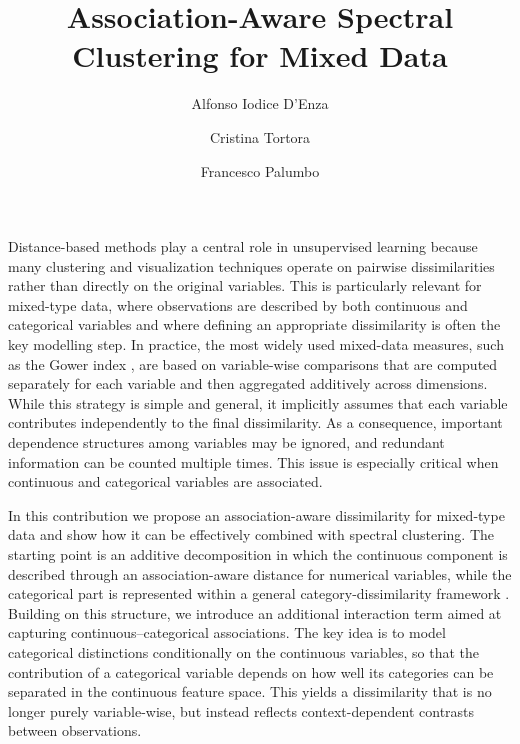 \documentclass{svproc}
\begin{document}
\mainmatter
%
\title{Association-Aware Spectral Clustering for Mixed Data}
%
%
\author{Alfonso Iodice D'Enza \and
Cristina Tortora \and
Francesco Palumbo}
%


\maketitle

\bigskip %

Distance-based methods play a central role in unsupervised learning because many clustering and visualization techniques operate on pairwise dissimilarities rather than directly on the original variables. This is particularly relevant for mixed-type data, where observations are described by both continuous and categorical variables and where defining an appropriate dissimilarity is often the key modelling step. In practice, the most widely used mixed-data measures, such as the Gower index \cite{gower1971}, are based on variable-wise comparisons that are computed separately for each variable and then aggregated additively across dimensions. While this strategy is simple and general, it implicitly assumes that each variable contributes independently to the final dissimilarity. As a consequence, important dependence structures among variables may be ignored, and redundant information can be counted multiple times. This issue is especially critical when continuous and categorical variables are associated.

In this contribution we propose an association-aware dissimilarity for mixed-type data and show how it can be effectively combined with spectral clustering. The starting point is an additive decomposition in which the continuous component is described through an association-aware distance for numerical variables, while the categorical part is represented within a general category-dissimilarity framework \cite{velden2024}. Building on this structure, we introduce an additional interaction term aimed at capturing continuous--categorical associations. The key idea is to model categorical distinctions conditionally on the continuous variables, so that the contribution of a categorical variable depends on how well its categories can be separated in the continuous feature space. This yields a dissimilarity that is no longer purely variable-wise, but instead reflects context-dependent contrasts between observations.
\end{document}
